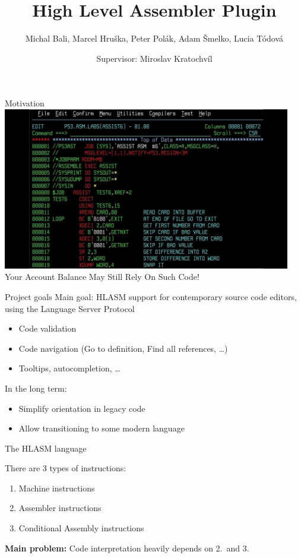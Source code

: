 \documentclass[10pt]{beamer}
\title{High Level Assembler Plugin}
\date{Supervisor: Miroslav Kratochvíl}
\author{Michal Bali, Marcel Hruška, Peter Polák, Adam Šmelko, Lucia Tódová}
\begin{document}
\maketitle


\begin{frame}[standout]{Motivation}
\centering
\hspace*{-1cm}
\includegraphics[width=12.6cm]{img/maxresdefault}
\pause
\footnotesize Your Account Balance May Still Rely On Such Code!

\end{frame}

\begin{frame}{Project goals}
    Main goal: HLASM support for contemporary source code editors, using the Language Server Protocol
    \begin{itemize}
    	\item Code validation
    	\item Code navigation (Go to definition, Find all references, \dots)
    	\item Tooltips, autocompletion, \dots
    \end{itemize}

    In the long term:
    \begin{itemize}
        \item Simplify orientation in legacy code
        \item Allow transitioning to some modern language %
    \end{itemize}
\end{frame}


\begin{frame}{The HLASM language}

There are 3 types of instructions:
\begin{enumerate}
	\item Machine instructions
	\item Assembler instructions \\
	\item Conditional Assembly instructions \\
\end{enumerate}

\textbf{Main problem:} Code interpretation heavily depends on 2.~and 3.

\end{frame}
\end{document}
